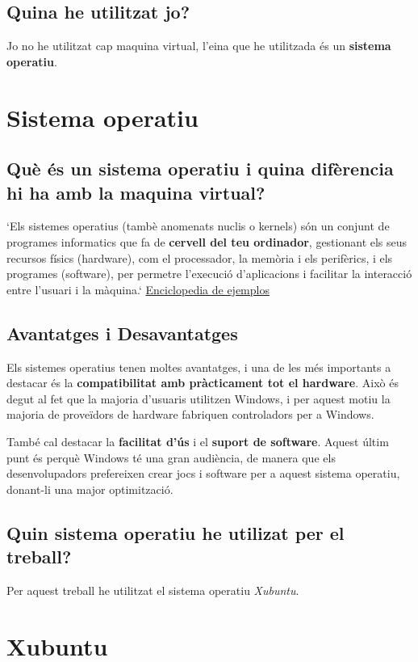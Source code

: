 \subsection{Quina he utilitzat jo?}
Jo no he utilitzat cap maquina virtual, l'eina que he utilitzada és un \textbf{sistema operatiu}.

\section{Sistema operatiu}
\subsection{Què és un sistema operatiu i quina difèrencia hi ha amb la maquina virtual?}
`Els sistemes operatius (tambè anomenats nuclis o kernels) són un conjunt de programes informatics que fa de \textbf{cervell del teu ordinador}, gestionant els seus recursos físics (hardware), com el processador, la memòria i els perifèrics, i els programes (software), per permetre l'execució d'aplicacions i facilitar la interacció entre l'usuari i la màquina.` \href{https://www.ejemplos.co/20-ejemplos-de-sistemas-operativos/#:~:text=Un\%20Sistema\%20Operativo\%20(SO)\%20es,\%2C\%20MacOS\%2C\%20Windows\%2C\%20Haiku.}{Enciclopedia de ejemplos}
\subsection{Avantatges i Desavantatges}
Els sistemes operatius tenen moltes avantatges, i una de les més importants a destacar és la \textbf{compatibilitat amb pràcticament tot el hardware}. Això és degut al fet que la majoria d’usuaris utilitzen Windows, i per aquest motiu la majoria de proveïdors de hardware fabriquen controladors per a Windows.

També cal destacar la \textbf{facilitat d’ús} i el \textbf{suport de software}. Aquest últim punt és perquè Windows té una gran audiència, de manera que els desenvolupadors prefereixen crear jocs i software per a aquest sistema operatiu, donant-li una major optimització.
\subsection{Quin sistema operatiu he utilizat per el treball?}
Per aquest treball he utilitzat el sistema operatiu \textit{Xubuntu}\cite{xubuntu}.
\section{Xubuntu}
